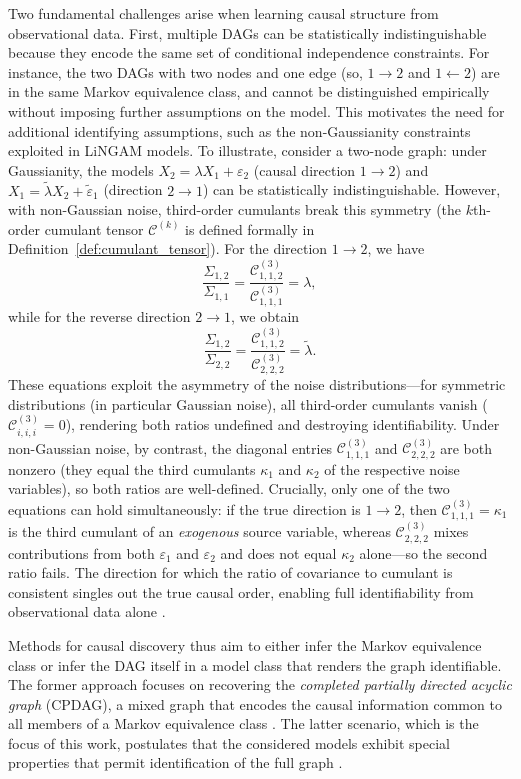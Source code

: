 \documentclass[11pt,a4paper]{article}
\numberwithin{equation}{section}
\begin{document}
Two fundamental challenges arise when learning causal structure from observational data. First, multiple DAGs can be statistically indistinguishable because they encode the same set of conditional independence constraints. For instance, the two DAGs with two nodes and one edge (so, $1 \to 2$ and $1 \leftarrow 2$) are in the same Markov equivalence class, and cannot be distinguished empirically without imposing further assumptions on the model. This motivates the need for additional identifying assumptions, such as the non-Gaussianity constraints exploited in LiNGAM models. To illustrate, consider a two-node graph: under Gaussianity, the models $X_2 = \lambda X_1 + \varepsilon_2$ (causal direction $1 \to 2$) and $X_1 = \tilde{\lambda} X_2 + \tilde{\varepsilon}_1$ (direction $2 \to 1$) can be statistically indistinguishable. However, with non-Gaussian noise, third-order cumulants break this symmetry (the $k$th-order cumulant tensor $\mathcal{C}^{(k)}$ is defined formally in Definition~\ref{def:cumulant_tensor}). For the direction $1 \to 2$, we have
\[
\frac{\Sigma_{1,2}}{\Sigma_{1,1}} = \frac{\mathcal{C}^{(3)}_{1,1,2}}{\mathcal{C}^{(3)}_{1,1,1}} = \lambda,
\]
while for the reverse direction $2 \to 1$, we obtain
\[
\frac{\Sigma_{1,2}}{\Sigma_{2,2}} = \frac{\mathcal{C}^{(3)}_{1,1,2}}{\mathcal{C}^{(3)}_{2,2,2}} = \tilde{\lambda}.
\]
These equations exploit the asymmetry of the noise distributions—for
symmetric distributions (in particular Gaussian noise), all third-order
cumulants vanish ($\mathcal{C}^{(3)}_{i,i,i} = 0$), rendering both ratios
undefined and destroying identifiability.  Under non-Gaussian noise, by
contrast, the diagonal entries $\mathcal{C}^{(3)}_{1,1,1}$ and
$\mathcal{C}^{(3)}_{2,2,2}$ are both nonzero (they equal the third
cumulants $\kappa_1$ and $\kappa_2$ of the respective noise variables), so
both ratios are well-defined.  Crucially, only one of the two equations can
hold simultaneously: if the true direction is $1\to 2$, then
$\mathcal{C}^{(3)}_{1,1,1}=\kappa_1$ is the third cumulant of an
\emph{exogenous} source variable, whereas $\mathcal{C}^{(3)}_{2,2,2}$
mixes contributions from both $\varepsilon_1$ and $\varepsilon_2$ and does
not equal $\kappa_2$ alone—so the second ratio fails.  The direction for
which the ratio of covariance to cumulant is consistent singles out the
true causal order, enabling full identifiability from observational data
alone \citep{shimizu:hoyer:2006}.

Methods for causal discovery thus aim to either infer the Markov equivalence class or infer the DAG itself in a model class that renders the graph identifiable. The former approach focuses on recovering the \emph{completed partially directed acyclic graph} (CPDAG), a mixed graph that encodes the causal information common to all members of a Markov equivalence class \citep{meek:1995}. The latter scenario, which is the focus of this work, postulates that the considered models exhibit special properties that permit identification of the full graph \citep{shimizu:hoyer:2006}.
\end{document}
